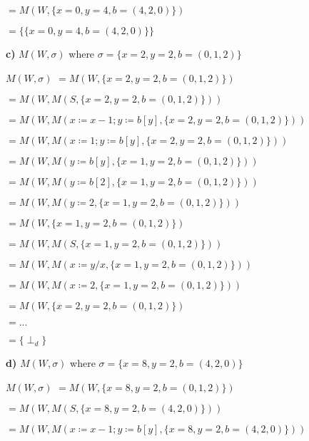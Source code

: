 \documentclass{article}
\begin{document}
\qquad \qquad \qquad \qquad \qquad $=M(W,\{x=0, y=4,b=(4,2,0)\})$

\qquad \qquad \qquad \qquad \qquad $=\{\{x=0, y=4,b=(4,2,0)\}\}$

\vspace{10pt}

\textbf{c)} $M(W,\sigma)$ where $\sigma=\{x=2, y=2,b=(0,1,2)\}$

\qquad $M(W,\sigma)$ \qquad \qquad $=M(W,\{x=2, y=2,b=(0,1,2)\})$

\qquad \qquad \qquad \qquad \qquad $=M(W,M(S,\{x=2, y=2,b=(0,1,2)\}))$

\qquad \qquad \qquad \qquad \qquad $=M(W,M(x \coloneqq x-1; y \coloneqq b[y],\{x=2, y=2,b=(0,1,2)\}))$

\qquad \qquad \qquad \qquad \qquad $=M(W,M(x \coloneqq 1; y \coloneqq b[y],\{x=2, y=2,b=(0,1,2)\}))$

\qquad \qquad \qquad \qquad \qquad $=M(W,M(y \coloneqq b[y],\{x=1, y=2,b=(0,1,2)\}))$

\qquad \qquad \qquad \qquad \qquad $=M(W,M(y \coloneqq b[2],\{x=1, y=2,b=(0,1,2)\}))$

\qquad \qquad \qquad \qquad \qquad $=M(W,M(y \coloneqq 2,\{x=1, y=2,b=(0,1,2)\}))$

\qquad \qquad \qquad \qquad \qquad $=M(W,\{x=1, y=2,b=(0,1,2)\})$

\qquad \qquad \qquad \qquad \qquad $=M(W,M(S,\{x=1, y=2,b=(0,1,2)\}))$

\qquad \qquad \qquad \qquad \qquad $=M(W,M(x \coloneqq y/x,\{x=1, y=2,b=(0,1,2)\}))$

\qquad \qquad \qquad \qquad \qquad $=M(W,M(x \coloneqq 2,\{x=1, y=2,b=(0,1,2)\}))$

\qquad \qquad \qquad \qquad \qquad $=M(W,\{x=2, y=2,b=(0,1,2)\})$

\qquad \qquad \qquad \qquad \qquad $=...$

\qquad \qquad \qquad \qquad \qquad $=\{\perp_d\}$

\vspace{10pt}

\textbf{d)} $M(W,\sigma)$ where $\sigma=\{x=8, y=2,b=(4,2,0)\}$

\qquad $M(W,\sigma)$ \qquad \qquad $=M(W,\{x=8, y=2,b=(0,1,2)\})$

\qquad \qquad \qquad \qquad \qquad $=M(W,M(S,\{x=8, y=2,b=(4,2,0)\}))$

\qquad \qquad \qquad \qquad \qquad $=M(W,M(x \coloneqq x-1; y \coloneqq b[y],\{x=8, y=2,b=(4,2,0)\}))$
\end{document}
